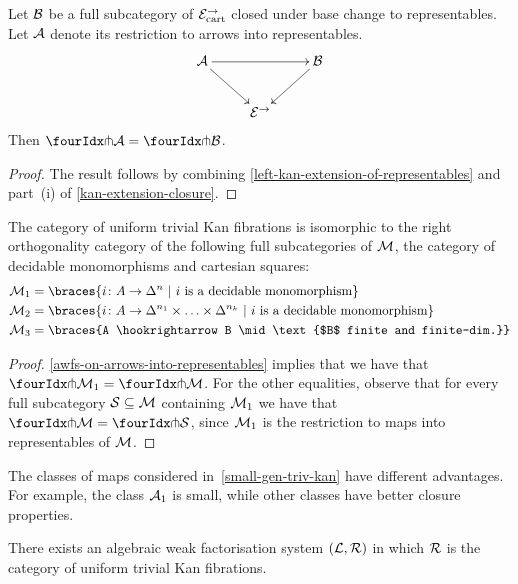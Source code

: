 \documentclass[reqno,10pt,a4paper,oneside]{amsart}
\begin{document}
\begin{lemma}
\label{awfs-on-arrows-into-representables}
Let $\cal{B}$ be a full subcategory of $\catE_{\cart}^{\to}$ closed under base change to representables.
Let $\cal{A}$ denote its restriction to arrows into representables.
\[
\xymatrix{
  \cal{A}
  \ar[rr]
  \ar[dr]
&&
  \cal{B}
  \ar[dl]
\\&
  \catE^{\to}
}
\]
Then $\liftr{\cal{A}} = \liftr{\cal{B}}$.
\end{lemma}

\begin{proof} The result follows by combining \cref{left-kan-extension-of-representables} and part~(i) of \cref{kan-extension-closure}. 
\end{proof}


\begin{theorem} \label{small-gen-triv-kan}
The category of uniform trivial Kan fibrations is isomorphic to the right orthogonality 
category of the following full subcategories of $\cal{M}$, the category of decidable
monomorphisms and cartesian squares:
\begin{align*}
\cal{M}_1 & = \braces{i \co A \rightarrow \Delta^{n} \ | \ i \text{ is a  decidable monomorphism} } \\ 
\cal{M}_2  & = \braces{i \co A \rightarrow \Delta^{n_1} \times \ldots \times \Delta^{n_k} 
\ | \ i \text{ is a  decidable monomorphism} }  \\
\cal{M}_3  & = \braces{A \hookrightarrow B \mid \text{$B$ finite and finite-dim.}} \\
\end{align*}
\end{theorem}

\begin{proof}    \cref{awfs-on-arrows-into-representables} implies that we have that $\liftr{\cal{M}_1}  = \liftr{\cal{M}}$.
For the other equalities, observe that for every full subcategory $\cal{S} \subseteq \cal{M}$ containing $\cal{M}_1$ we have that $\liftr{\cal{M}} = \liftr{\cal{S}}$, since $\cal{M}_1$ is the restriction to maps into representables  of $\cal{M}$. 
\end{proof}

The classes of maps considered in~\cref{small-gen-triv-kan} have different advantages. For example, 
the class $\cal{A}_1$ is small, while other classes have better closure properties. 




\begin{corollary} There exists an algebraic weak factorisation system $(\cal{L}, \cal{R})$ in which
$\cal{R}$ is the category of uniform trivial Kan fibrations.
\end{corollary}
\end{document}
